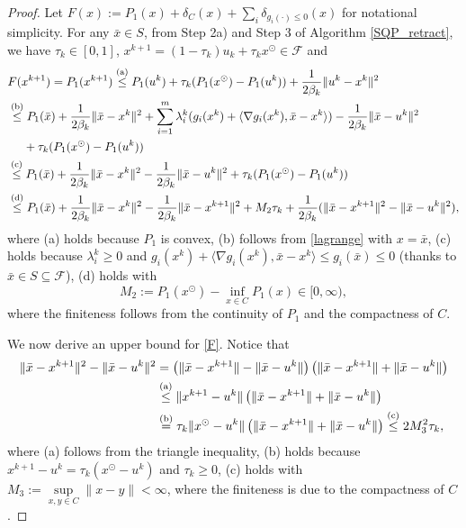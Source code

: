 \documentclass[10pt]{article}
\numberwithin{equation}{section}
\def\xfeas{x^\odot}
\begin{document}
\begin{proof}
Let $F(x):= P_1(x) + \delta_C(x) + \sum\limits_i\delta_{g_i(\cdot) \le0}(x)$ for notational simplicity. For any $\bar{x}\in S$, from Step 2a) and Step 3 of Algorithm \ref{SQP_retract}, we have $\tau_k\in[0, 1]$, $x^{k+1} = (1-\tau_k)u_k +\tau_k\xfeas \in \mathcal{F}$ and
\begin{align}\label{F}
&F(x^{k+1})= P_1(x^{k+1})\overset{\rm (a)}\leq P_1(u^k) + \tau_k(P_1(\xfeas) - P_1(u^k)) + \frac{1}{2\beta_k}\|u^k - x^k\|^2 \nonumber\\
&\overset{\rm (b)}\leq P_1(\bar{x}) + \frac{1}{2\beta_k}\|\bar{x} - x^k\|^2 + \sum_{i=1}^m\lambda^k_i(g_i(x^k) + \langle \nabla g_i(x^k), \bar{x} - x^k\rangle)- \frac{1}{2\beta_k}\|\bar{x} - u^k\|^2 \nonumber\\
 &~~~~+ \tau_k(P_1(\xfeas) - P_1(u^k))\nonumber\\
 &\overset{\rm (c)}\leq P_1(\bar{x}) + \frac{1}{2\beta_k}\|\bar{x} - x^k\|^2 - \frac{1}{2\beta_k}\|\bar{x} - u^k\|^2 + \tau_k(P_1(\xfeas) - P_1(u^k))\nonumber\\
 &\overset{\rm (d)}\leq P_1(\bar{x}) + \frac{1}{2\beta_k}\|\bar{x} - x^k\|^2 - \frac{1}{2\beta_k}\|\bar{x} - x^{k+1}\|^2 + M_2\tau_k + \frac{1}{2\beta_k}(\|\bar{x} - x^{k+1}\|^2 - \|\bar{x} - u^k\|^2),
 \end{align}
where (a) holds because $P_1$ is convex, (b) follows from \eqref{lagrange} with $x = \bar x$, (c) holds because $\lambda^k_i\geq 0$ and $g_i(x^k) + \langle \nabla g_i(x^k), \bar{x} - x^k\rangle \leq g_i(\bar{x}) \leq 0$ (thanks to $\bar{x}\in S \subseteq\mathcal{F}$), (d) holds with $$M_2:= P_1(\xfeas)- \inf\limits_{x\in C}P_1(x) \in [0,\infty),$$ where the finiteness follows from the continuity of $P_1$ and the compactness of $C$.

We now derive an upper bound for \eqref{F}. Notice that
\begin{align}\label{normsqu}
\|\bar{x} - x^{k+1}\|^2 - \|\bar{x} - u^k\|^2& =\left(\|\bar{x} - x^{k+1}\| - \|\bar{x} - u^k\|\right)\left(\|\bar{x} - x^{k+1}\| + \|\bar{x} - u^k\|\right) \nonumber\\
&\overset{\rm (a)}\leq \|x^{k+1} - u^k\|\left(\|\bar{x} - x^{k+1}\| + \|\bar{x} - u^k\|\right)\nonumber\\
&\overset{\rm (b)}= \tau_k\|\xfeas - u^k\|\left(\|\bar{x} - x^{k+1}\| + \|\bar{x} - u^k\|\right)\overset{\rm (c)}\leq 2M_3^2 \tau_k,
\end{align}
where (a) follows from the triangle inequality, (b) holds because $x^{k+1} - u^k = \tau_k(\xfeas - u^k)$ and $\tau_k \geq 0$, (c) holds with $M_3:= \sup\limits_{x,y\in C}\|x - y\| < \infty$, where the finiteness is due to the compactness of $C$.


\end{proof}
\end{document}
